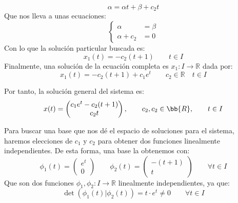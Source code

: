 \begin{ejemplo}
\begin{equation*}
        \alpha = \alpha t + \beta + c_2 t
    \end{equation*}
    Que nos lleva a unas ecuaciones:
    \begin{equation*}
        \left\{\begin{array}{rl}
                \alpha &= \beta \\
                \alpha + c_2 &= 0
        \end{array}\right. 
    \end{equation*}
    Con lo que la solución particular buscada es:
    \begin{equation*}
        x_1(t) = -c_2(t+1) \qquad t\in I
    \end{equation*}
    Finalmente, una solución de la ecuación completa es $x_1:I\rightarrow\mathbb{R}$ dada por:
    \begin{equation*}
        x_1(t) = -c_2(t+1) + c_1 e^t \qquad c_2\in \mathbb{R} \quad  t\in I
    \end{equation*}

    Por tanto, la solución general del sistema es:
    \begin{equation*}
        x(t)=\begin{pmatrix}
            c_1e^t -c_2(t+1)\\
            c_2t
        \end{pmatrix},\qquad c_2,c_2\in \bb{R},\qquad t\in I
    \end{equation*}

    Para buscar una base que nos dé el espacio de soluciones para el sistema, haremos elecciones de $c_1$ y $c_2$ para obtener dos funciones linealmente independientes. De esta forma, una base la obtenemos con:
    \begin{equation*}
        \phi_1(t) = \left(\begin{array}{c}
            e^t \\
            0
        \end{array}\right) \qquad 
        \phi_2(t) = \left(\begin{array}{c}
            -(t+1) \\
            t
        \end{array}\right) \qquad \forall t\in I
    \end{equation*}
    Que son dos funciones $\phi_1,\phi_2:I\rightarrow\mathbb{R}$ linealmente independientes, ya que:
    \begin{equation*}
        \det(\phi_1(t)|\phi_2(t)) = t\cdot e^t \neq 0 \qquad \forall t\in I
    \end{equation*}
\end{ejemplo}

